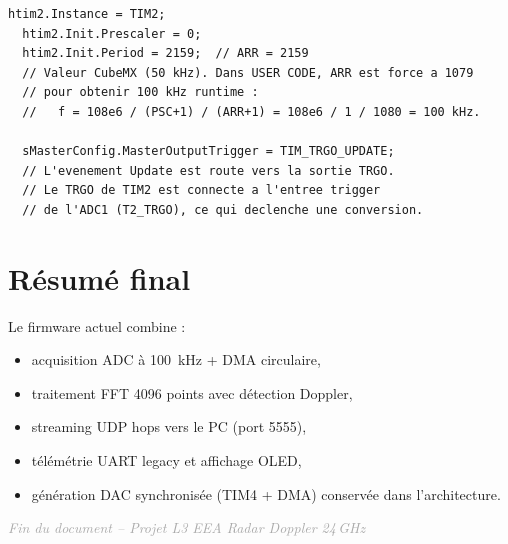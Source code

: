 \documentclass[a4paper,11pt]{article}
\begin{document}
\begin{lstlisting}[style=cstyle,caption={Configuration du timer d'\'echantillonnage}]
  htim2.Instance = TIM2;
  htim2.Init.Prescaler = 0;
  htim2.Init.Period = 2159;  // ARR = 2159
  // Valeur CubeMX (50 kHz). Dans USER CODE, ARR est force a 1079
  // pour obtenir 100 kHz runtime :
  //   f = 108e6 / (PSC+1) / (ARR+1) = 108e6 / 1 / 1080 = 100 kHz.

  sMasterConfig.MasterOutputTrigger = TIM_TRGO_UPDATE;
  // L'evenement Update est route vers la sortie TRGO.
  // Le TRGO de TIM2 est connecte a l'entree trigger
  // de l'ADC1 (T2_TRGO), ce qui declenche une conversion.
\end{lstlisting}

\newpage

\section{R\'esum\'e final}

Le firmware actuel combine :
\begin{itemize}[leftmargin=2em]
  \item acquisition ADC \`a 100~kHz + DMA circulaire,
  \item traitement FFT 4096 points avec d\'etection Doppler,
  \item streaming UDP hops vers le PC (port 5555),
  \item t\'el\'em\'etrie UART legacy et affichage OLED,
  \item g\'en\'eration DAC synchronis\'ee (TIM4 + DMA) conserv\'ee dans l'architecture.
\end{itemize}

\vfill
\begin{center}
\textcolor{darkgray}{\small\textit{Fin du document -- Projet L3 EEA Radar Doppler 24\,GHz}}
\end{center}
\end{document}
